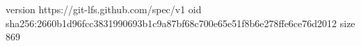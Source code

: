 version https://git-lfs.github.com/spec/v1
oid sha256:2660b1d96fcc3831990693b1c9a87bf68c700e65e51f8b6e278ffe6ce76d2012
size 869
